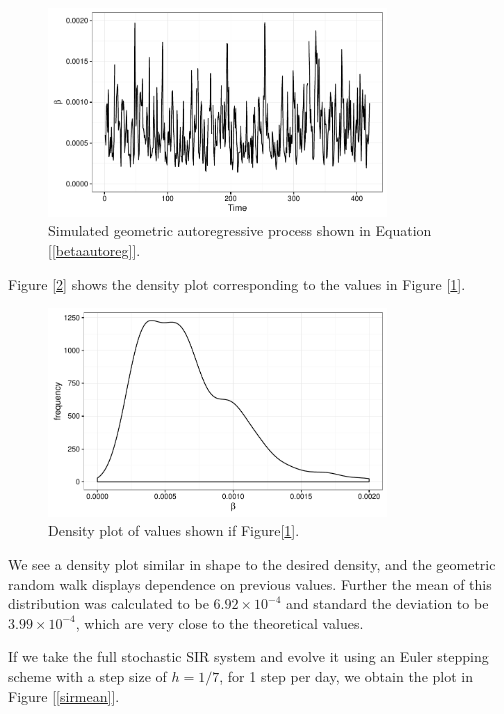 	\begin{figure}
        \centering
        \captionsetup{width=.8\linewidth}
        \includegraphics[width=0.8\textwidth]{./images/betaplot.pdf}
        \caption{Simulated geometric autoregressive process shown in Equation [\ref{betaautoreg}]. \label{betaplot}}
    \end{figure}

    Figure [\ref{betadensity}] shows the density plot corresponding to the values in Figure [\ref{betaplot}].

    \begin{figure}
        \centering
        \captionsetup{width=.8\linewidth}
        \includegraphics[width=0.8\textwidth]{./images/betadensity.pdf}
        \caption{Density plot of values shown if Figure[\ref{betaplot}]. \label{betadensity}}
    \end{figure}

    We see a density plot similar in shape to the desired density, and the geometric random walk displays dependence on previous values. Further the mean of this distribution was calculated to be $6.92 \times 10^{-4}$ and standard the deviation to be $3.99 \times 10^{-4}$, which are very close to the theoretical values.

    If we take the full stochastic SIR system and evolve it using an Euler stepping scheme with a step size of $h = 1/7$, for 1 step per day, we obtain the plot in Figure [\ref{sirmean}].

